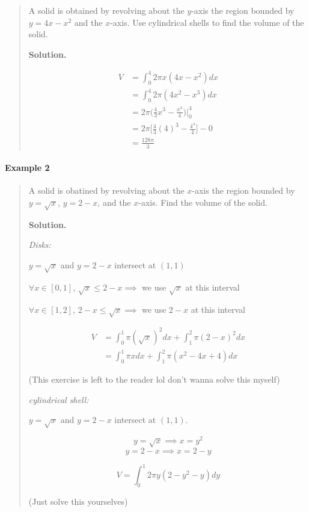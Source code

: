 \documentclass[
]{article}
\begin{document}
\begin{quote}
A solid is obtained by revolving about the \(y\)-axis the region bounded
by \(y = 4x - x^2\) and the \(x\)-axis. Use cylindrical shells to find
the volume of the solid.

\textbf{Solution.}

\begin{align*}
V &= \int_0^4 2 \pi x (4x-x^2) dx \\
&= \int_0^4 2 \pi (4x^2 - x^3)dx \\
&= 2\pi \Big( \frac{4}{3}x^3 - \frac{x^4}{4} \Big) \Bigg|_0^4\\
&= 2\pi \Big[ \frac{4}{3} (4)^3 - \frac{4^4}{4} \Big] - 0\\
&= \frac{128\pi}{3}
\end{align*}
\end{quote}

\hypertarget{example-2-4}{%
\paragraph*{Example 2}\label{example-2-4}}

\begin{quote}
A solid is obatined by revolving about the \(x\)-axis the region bounded
by \(y = \sqrt{x}\), \(y = 2-x\), and the \(x\)-axis. Find the volume of
the solid.

\textbf{Solution.}

\emph{Disks:}

\(y = \sqrt{x}\) and \(y = 2-x\) intersect at \((1,1)\)

\(\forall x \in [0,1]\), \(\sqrt{x} \leq 2-x \implies\) we use
\(\sqrt{x}\) at this interval

\(\forall x \in [1,2]\), \(2-x \leq \sqrt{x} \implies\) we use \(2-x\)
at this interval

\begin{align*}
V &= \int_0^1 \pi (\sqrt{x})^2 dx + \int_1^2 \pi (2-x)^2 dx \\
&= \int_0^1 \pi x dx + \int_1^2 \pi (x^2 - 4x +4) dx
\end{align*}

(This exercise is left to the reader lol don't wanna solve this myself)

\emph{cylindrical shell:}

\(y = \sqrt{x}\) and \(y = 2-x\) intersect at \((1,1)\).

\[ y = \sqrt{x} \implies x = y^2 \] \[ y = 2-x \implies x = 2-y \]

\[ V = \int_0^1 2\pi y (2-y^2-y) dy \]

(Just solve this yourselves)
\end{quote}
\end{document}

